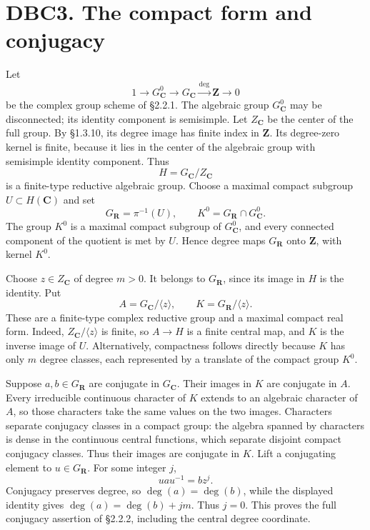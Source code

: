 \documentclass[
]{report}
\begin{document}
\section{DBC3. The compact form and
conjugacy}\label{dbc3.-the-compact-form-and-conjugacy}

Let \[
1\longrightarrow G_{\mathbf C}^{0}\longrightarrow G_{\mathbf C}
 \xrightarrow{\deg}\mathbf Z\longrightarrow0
\tag{DBC.3.1}
\] be the complex group scheme of §2.2.1. The algebraic group
\(G_{\mathbf C}^{0}\) may be disconnected; its identity component is
semisimple. Let \(Z_{\mathbf C}\) be the center of the full group. By
§1.3.10, its degree image has finite index in \(\mathbf Z\). Its
degree-zero kernel is finite, because it lies in the center of the
algebraic group with semisimple identity component. Thus \[
H=G_{\mathbf C}/Z_{\mathbf C}
\] is a finite-type reductive algebraic group. Choose a maximal compact
subgroup \(U\subset H(\mathbf C)\) and set \[
G_{\mathbf R}=\pi^{-1}(U),\qquad
K^0=G_{\mathbf R}\cap G_{\mathbf C}^{0}.
\tag{DBC.3.2}
\] The group \(K^0\) is a maximal compact subgroup of
\(G_{\mathbf C}^{0}\), and every connected component of the quotient is
met by \(U\). Hence degree maps \(G_{\mathbf R}\) onto \(\mathbf Z\),
with kernel \(K^0\).

Choose \(z\in Z_{\mathbf C}\) of degree \(m>0\). It belongs to
\(G_{\mathbf R}\), since its image in \(H\) is the identity. Put \[
A=G_{\mathbf C}/\langle z\rangle,
\qquad K=G_{\mathbf R}/\langle z\rangle.
\tag{DBC.3.3}
\] These are a finite-type complex reductive group and a maximal compact
real form. Indeed, \(Z_{\mathbf C}/\langle z\rangle\) is finite, so
\(A\to H\) is a finite central map, and \(K\) is the inverse image of
\(U\). Alternatively, compactness follows directly because \(K\) has
only \(m\) degree classes, each represented by a translate of the
compact group \(K^0\).

Suppose \(a,b\in G_{\mathbf R}\) are conjugate in \(G_{\mathbf C}\).
Their images in \(K\) are conjugate in \(A\). Every irreducible
continuous character of \(K\) extends to an algebraic character of
\(A\), so those characters take the same values on the two images.
Characters separate conjugacy classes in a compact group: the algebra
spanned by characters is dense in the continuous central functions,
which separate disjoint compact conjugacy classes. Thus their images are
conjugate in \(K\). Lift a conjugating element to
\(u\in G_{\mathbf R}\). For some integer \(j\), \[
uau^{-1}=b z^j.
\] Conjugacy preserves degree, so \(\deg(a)=\deg(b)\), while the
displayed identity gives \(\deg(a)=\deg(b)+jm\). Thus \(j=0\). This
proves the full conjugacy assertion of §2.2.2, including the central
degree coordinate.
\end{document}
